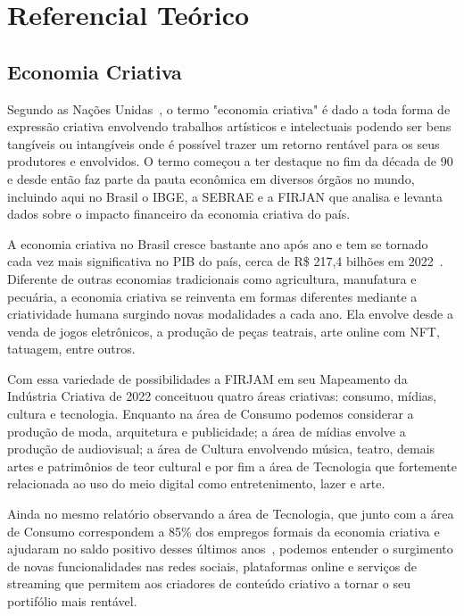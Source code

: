 \chapter{Referencial Teórico}\label{ch:referencial-teorico}

\section{Economia Criativa}\label{sec:economia-criativa}

Segundo as Nações Unidas~\cite{sebrae}, o termo "economia criativa" é dado a toda forma de expressão criativa envolvendo trabalhos artísticos e intelectuais podendo ser bens tangíveis ou intangíveis onde é possível trazer um retorno rentável para os seus produtores e envolvidos.
O termo começou a ter destaque no fim da década de 90 e desde então faz parte da pauta econômica em diversos órgãos no mundo, incluindo aqui no Brasil o IBGE, a  SEBRAE e a FIRJAN que analisa e levanta dados sobre o impacto financeiro da economia criativa do país.

A economia criativa no Brasil cresce bastante ano após ano e tem se tornado cada vez mais significativa no PIB do país, cerca de R\$ 217,4 bilhões em 2022~\cite{firjam}.
Diferente de outras economias tradicionais como agricultura, manufatura e pecuária, a economia criativa se reinventa em formas diferentes mediante a criatividade humana surgindo novas modalidades a cada ano.
Ela envolve desde a venda de jogos eletrônicos, a produção de peças teatrais, arte online com NFT, tatuagem, entre outros.

Com essa variedade de possibilidades a FIRJAM em seu Mapeamento da Indústria Criativa de 2022 conceituou quatro áreas criativas: consumo, mídias, cultura e tecnologia.
Enquanto na área de Consumo podemos considerar a produção de moda, arquitetura e publicidade; a área de mídias envolve a produção de audiovisual; a área de Cultura envolvendo música, teatro, demais artes e patrimônios de teor cultural e por fim a área de Tecnologia que fortemente relacionada ao uso do meio digital como entretenimento, lazer e arte.

Ainda no mesmo relatório observando a área de Tecnologia, que junto com a área de Consumo correspondem a 85\% dos empregos formais da economia criativa e ajudaram no saldo positivo desses últimos anos~\cite{firjam}, podemos entender o surgimento de novas funcionalidades nas redes sociais, plataformas online e serviços de streaming que permitem aos criadores de conteúdo criativo a tornar o seu portifólio mais rentável.

